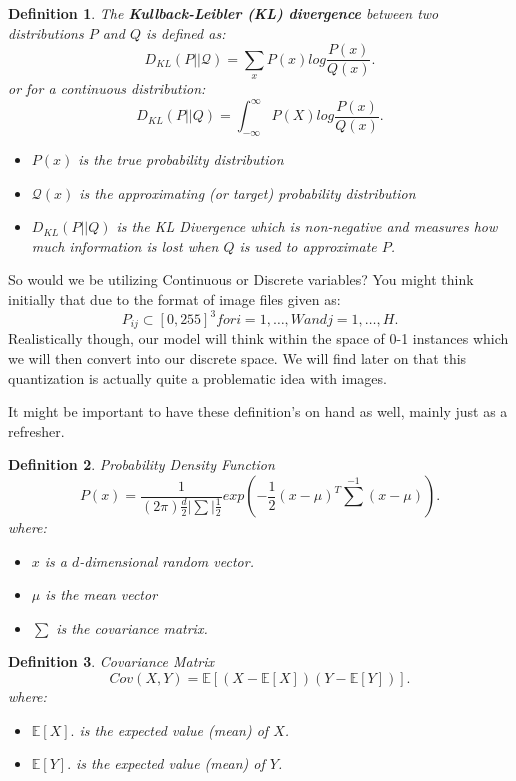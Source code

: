 \documentclass[10pt, oneside]{report}
\newcommand{\E}{\mathbb{E}}
\newtheorem{defn}{Definition}
\begin{document}
\begin{defn}
    The \textbf{Kullback-Leibler (KL) divergence} between two distributions $P$ and $Q$ is defined as:
    \[
        D_{KL}(P||\mathscr{Q}) = \sum_{x} P(x) log \frac{P(x)}{Q(x)}
    .\] 
    or for a continuous distribution:
    \[
        D_{KL}(P||Q) = \int_{-\infty}^{\infty}  P(X) log \frac{P(x)}{Q(x)} 
    .\] 
    \begin{itemize}
        \item $P(x)$ is the true probability distribution
        \item $\mathcal{Q}(x)$ is the approximating (or target) probability distribution
        \item $D_{KL}(P||Q)$ is the KL Divergence which is non-negative and measures how much information is lost when $Q$ is used to approximate $P$.
    \end{itemize}
\end{defn}

So would we be utilizing Continuous or Discrete variables? You might think initially that due to the format of image files given as:
\[
    P_{ij} \subset [0, 255]^3   for i = 1, \ldots, W and j=1, \ldots, H 
.\] 
Realistically though, our model will think within the space of 0-1 instances which we will then convert into our discrete space.  We will find later on that this quantization is actually quite a problematic idea with images.

It might be important to have these definition's on hand as well, mainly just as a refresher.

\begin{defn}
    Probability Density Function
    \[
    P(x) = \frac{1}{(2\pi)\frac{d}{2}|\sum|\frac{1}{2}}exp(-\frac{1}{2}(x - \mu)^T \sum^{-1}(x - \mu)) 
    .\] 
    where:
    \begin{itemize}
        \item $x$ is a $d$-dimensional random vector.
        \item $\mu$ is the mean vector
        \item $\sum$ is the covariance matrix.
    \end{itemize}
\end{defn}

\begin{defn}
    Covariance Matrix
    \[
        Cov(X, Y) = \E[(X - \E[X])(Y - \E[Y])]
    .\] 
    where:
    \begin{itemize}
        \item $\E[X].$ is the expected value (mean) of $X$.
        \item $\E[Y].$ is the expected value (mean) of $Y$.
    \end{itemize}
\end{defn}
\end{document}
